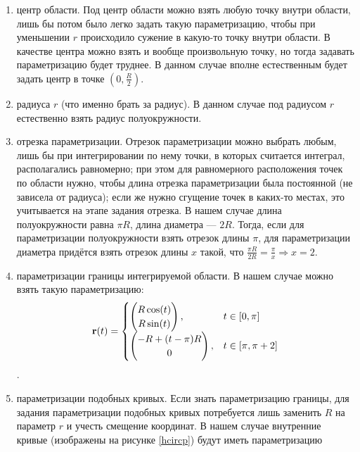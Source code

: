 \documentclass[a4paper, 12pt]{article}
\begin{document}
\begin{enumerate}
  \item  { центр области}. Под центр области можно взять любую точку внутри области, лишь бы потом было легко задать такую параметризацию, чтобы при уменьшении $r$ происходило сужение в какую-то точку внутри области.
  В качестве центра можно взять и вообще произвольную точку, но тогда задавать параметризацию будет труднее. В данном случае вполне естественным будет задать центр в точке $(0,\frac{R}{2})$.
  \item { радиуса $r$ (что именно брать за радиус)}. В данном случае под радиусом $r$ естественно взять радиус полуокружности.
  \item { отрезка параметризации}. Отрезок параметризации можно выбрать любым, лишь бы при интегрировании по нему точки, в которых считается интеграл, располагались равномерно; при этом для равномерного расположения точек по области нужно, чтобы длина отрезка параметризации была постоянной (не зависела от радиуса); если же нужно сгущение точек в каких-то местах, это учитывается на этапе задания отрезка. В нашем случае длина полуокружности равна $\pi R$, длина диаметра --- $2R$. Тогда, если для параметризации полуокружности взять отрезок длины $\pi$, для параметризации диаметра придётся взять отрезок длины $x$ такой, что $\frac{\pi R}{2R}=\frac{\pi}{x} \Rightarrow x=2$.
  \item { параметризации границы интегрируемой области}. В нашем случае можно взять такую параметризацию:
  \begin{equation}
    {\bf r}(t)=
    \begin{cases}
      \begin{pmatrix}
        R \cos(t)\\
        R \sin(t)
      \end{pmatrix}, & t \in [0,\pi]\\
    \begin{pmatrix}
      -R+(t-\pi)R\\
      0
    \end{pmatrix}, & t \in [\pi,\pi+2]
  \end{cases}
  \end{equation}.
  \item { параметризации подобных кривых}. Если знать параметризацию границы, для задания параметризации подобных кривых потребуется лишь заменить $R$ на параметр $r$ и учесть смещение координат. В нашем случае внутренние кривые (изображены на рисунке \ref{hcircp}) будут иметь параметризацию

\end{enumerate}
\end{document}
